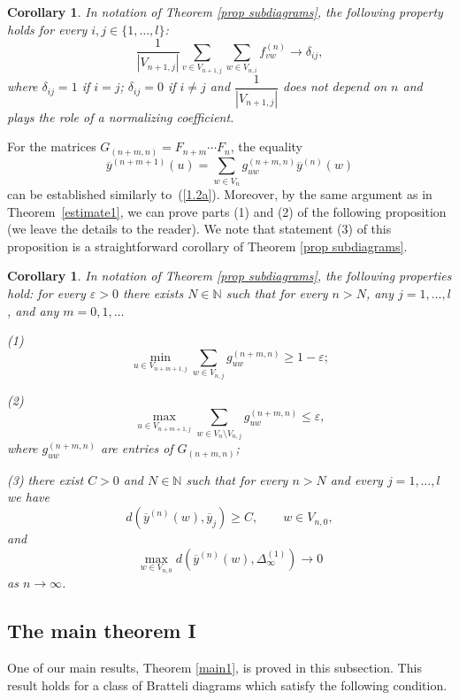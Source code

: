 \documentclass[11pt, english, reqno]{amsart}
\theoremstyle{definition}
\theoremstyle{remark}
\theoremstyle{plain}
\newtheorem{corol}[defin]{Corollary}
\def\ov{\overline}
\numberwithin{equation}{section}
\begin{document}
{\begin{corol}
In notation of Theorem \ref{prop subdiagrams}, the following property holds for every $i,j \in \{1, \ldots, l\}$:
$$
\frac{1}{|V_{n+1,j}|}\sum_{v \in V_{n+1,j}}\sum_{w \in V_{n,i}}
f^{(n)}_{vw} \rightarrow \delta_{ij},
$$
where $\delta_{ij} = 1$ if $i = j$; $\delta_{ij} = 0$ if $i \neq j$ and
$\dfrac{1}{|V_{n+1,j}|}$ does not depend on $n$ and plays the role of a normalizing coefficient.

\end{corol}

For the matrices $G_{(n+m,n)} = F_{n+m} \cdots F_{n}$, the equality
\begin{equation}\label{meaning_of_product_matrix}
\ov y^{(n+m+1)}(u) = \sum_{w \in V_n} g_{uw}^{(n+m,n)}\ov y^{(n)}(w)
\end{equation}
can be established similarly to~(\ref{1.2a}).
Moreover, by the same argument as in Theorem~\ref{estimate1},
we can prove
 parts (1) and (2) of the following proposition (we leave the details to the
 reader). We note that statement (3) of this proposition  is a straightforward
  corollary of Theorem \ref{prop subdiagrams}.

\begin{corol}\label{estimate2}
In notation of Theorem \ref{prop subdiagrams}, the following
properties hold: for every $\varepsilon > 0$ there exists $N \in \mathbb{N}$
 such that for every $n > N$,  any $j = 1,\ldots,l$, and any $m = 0,1,
 \ldots$

(1)
$$
\min_{u \in V_{n+m+1,j}}\sum_{w \in V_{n,j}} g_{uw}^{(n+m,n)} \geq 1 -
\varepsilon;
$$

(2)
$$
\max_{u \in V_{n+m+1,j}}\sum_{w \in V_n \setminus V_{n,j}} g_{uw}^{(n
+m,n)} \leq \varepsilon,
$$
where $g_{uw}^{(n+m,n)} $ are entries of  $G_{(n+m,n)}$;

(3) there exist $C > 0$ and $N \in \mathbb{N}$ such that for every $n
> N$ and every $j = 1,\ldots,l$ we have
$$
d(\ov y^{(n)}(w), \ov y_j) \geq C, \qquad  w \in V_{n,0},
$$
and
$$
\max_{w\in V_{n,0}}d(\ov y^{(n)}(w), \Delta^{(1)}_\infty) \rightarrow 0
$$
as $n\rightarrow \infty$.
\end{corol}

\subsection{The main theorem I} One of our main results, Theorem
 \ref{main1}, is
proved in this subsection. This result holds for a class of Bratteli diagrams
which  satisfy the following condition.

}
\end{document}
